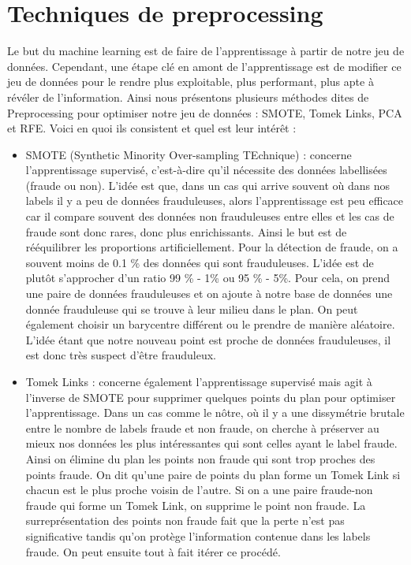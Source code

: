 \documentclass[a4paper]{article}
\begin{document}
\section{Techniques de preprocessing}

Le but du machine learning est de faire de l'apprentissage à partir de notre jeu de données. Cependant, une étape clé en amont de l'apprentissage est de modifier ce jeu de données pour le rendre plus exploitable, plus performant, plus apte à révéler de l'information. Ainsi nous présentons plusieurs méthodes dites de Preprocessing pour optimiser notre jeu de données : SMOTE, Tomek Links, PCA et RFE. Voici en quoi ils consistent et quel est leur intérêt : 
    
\begin{itemize}
\item SMOTE (Synthetic Minority Over-sampling TEchnique) : concerne l'apprentissage supervisé, c'est-à-dire qu'il nécessite des données labellisées (fraude ou non). L'idée est que, dans un cas qui arrive souvent où dans nos labels il y a peu de données frauduleuses, alors l'apprentissage est peu efficace car il compare souvent des données non frauduleuses entre elles et les cas de fraude sont donc rares, donc plus enrichissants. Ainsi le but est de rééquilibrer les proportions artificiellement. Pour la détection de fraude, on a souvent moins de 0.1 \% des données qui sont frauduleuses. L'idée est de plutôt s'approcher d'un ratio 99 \% - 1\% ou 95 \% - 5\%. Pour cela, on prend une paire de données frauduleuses et on ajoute à notre base de données une donnée frauduleuse qui se trouve à leur milieu dans le plan. On peut également choisir un barycentre différent ou le prendre de manière aléatoire. L'idée étant que notre nouveau point est proche de données frauduleuses, il est donc très suspect d'être frauduleux.

\item Tomek Links : concerne également l'apprentissage supervisé mais agit à l'inverse de SMOTE pour supprimer quelques points du plan pour optimiser l'apprentissage. Dans un cas comme le nôtre, où il y a une dissymétrie brutale entre le nombre de labels fraude et non fraude, on cherche à préserver au mieux nos données les plus intéressantes qui sont celles ayant le label fraude. Ainsi on élimine du plan les points non fraude qui sont trop proches des points fraude. On dit qu'une paire de points du plan forme un Tomek Link si chacun est le plus proche voisin de l'autre. Si on a une paire fraude-non fraude qui forme un Tomek Link, on supprime le point non fraude. La surreprésentation des points non fraude fait que la perte n'est pas significative tandis qu'on protège l'information contenue dans les labels fraude. On peut ensuite tout à fait itérer ce procédé.


\end{itemize}
\end{document}

